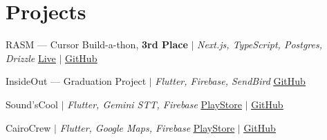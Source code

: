 \section{Projects}
\vspace{-4pt}
\resumeSubHeadingListStart

\resumeProjectHeading
  {RASM --- Cursor Build-a-thon, \textbf{3rd Place} $|$ \textit{Next.js, TypeScript, Postgres, Drizzle}}
  {\underline{\href{https://team-8-rasma.vercel.app/}{Live}} $|$ \underline{\href{https://github.com/Sherlemious/CursorBuildathon}{GitHub}}}
\resumeItemListStart
\resumeItemListEnd
\vspace{-12pt}

\resumeProjectHeading
  {InsideOut --- Graduation Project $|$ \textit{Flutter, Firebase, SendBird}}
  {\underline{\href{https://github.com/AnasNasr-afk/inside-out}{GitHub}}}
\resumeItemListStart
\resumeItemListEnd
\vspace{-12pt}

\resumeProjectHeading
  {Sound'sCool $|$ \textit{Flutter, Gemini STT, Firebase}}
  {\underline{\href{https://play.google.com/store/apps/details?id=com.anasnasr.soundscool}{PlayStore}} $|$ \underline{\href{https://github.com/AnasNasr-afk/sound-sCool}{GitHub}}}
\resumeItemListStart
\resumeItemListEnd
\vspace{-12pt}

\resumeProjectHeading
  {CairoCrew $|$ \textit{Flutter, Google Maps, Firebase}}
  {\underline{\href{https://play.google.com/store/apps/details?id=com.anasnasr.cairocrew}{PlayStore}} $|$ \underline{\href{https://github.com/AnasNasr-afk/flutter_maps}{GitHub}}}
\resumeItemListStart
\resumeItemListEnd

\resumeSubHeadingListEnd
\vspace{-14pt}
